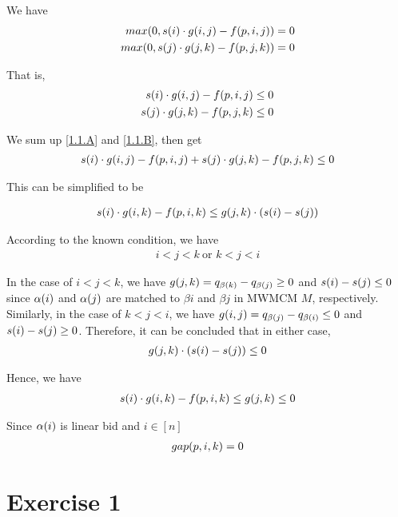 \documentclass[11pt,a4paper]{article}
\begin{document}
We have 
\begin{align}
    max(0, s(i) \cdot g(i,j) - f(p,i,j)) = 0 \\
    max(0, s(j) \cdot g(j,k) - f(p,j,k)) = 0
\end{align}

That is, 
\begin{align}
    s(i) \cdot g(i,j) - f(p,i,j) \leq 0 \label{1.1.A} \\
    s(j) \cdot g(j,k) - f(p,j,k) \leq 0 \label{1.1.B}
\end{align}

We sum up \eqref{1.1.A} and \eqref{1.1.B}, then get
\begin{align}
    s(i) \cdot g(i,j) - f(p,i,j) + s(j) \cdot g(j,k) - f(p,j,k) \leq 0 
\end{align}

This can be simplified to be 

\begin{align}
    s(i) \cdot g(i,k) - f(p,i,k) \leq  g(j,k) \cdot (s(i) - s(j))  
\end{align}

According to the known condition, we have
\begin{align}
    i < j < k \ \text{or }  k < j < i 
\end{align}

In the case of $i < j < k$, we have $g(j,k) = q_{\beta(k)} - q_{\beta(j)} \geq 0$ and 
$s(i) - s(j) \leq 0$ since $\alpha(i)$ and $\alpha(j)$ are matched to $\beta{i}$ and
$\beta{j}$ in MWMCM $M$, respectively. Similarly, in the case of $k < j < i$,
we have $g(i,j) = q_{\beta(j)} - q_{\beta(i)} \leq 0$ and $s(i) - s(j) \geq 0$.
Therefore, it can be concluded that in either case, 
\begin{align}
    g(j,k) \cdot (s(i) - s(j)) \leq 0
\end{align}

Hence, we have 
\begin{align}
    s(i) \cdot g(i,k) - f(p,i,k) \leq  g(j,k) \leq 0
\end{align}

Since $\alpha(i)$ is linear bid and $i \in [n]$
\begin{align}
    gap(p,i,k) = 0
\end{align}
\newpage

\section{Exercise 1}
\newcommand{\Lpn}{\ensuremath{L(p,n)}}
\newcommand{\Rpz}{\ensuremath{R(p,0)}}
 \\[0.5cm]
\end{document}
